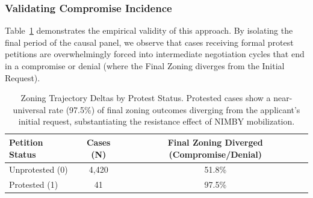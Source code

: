 \subsubsection{Validating Compromise Incidence}
Table~\ref{tbl:zoning_deltas} demonstrates the empirical validity of this approach. By isolating the final period of the causal panel, we observe that cases receiving formal protest petitions are overwhelmingly forced into intermediate negotiation cycles that end in a compromise or denial (where the Final Zoning diverges from the Initial Request).

\begin{table}[h!]
\centering
\begin{tabular}{l c c}
\toprule
\textbf{Petition Status} & \textbf{Cases (N)} & \textbf{Final Zoning Diverged (Compromise/Denial)} \\
\midrule
Unprotested (0) & 4,420 & 51.8\% \\
Protested (1) & 41 & 97.5\% \\
\bottomrule
\end{tabular}
\caption[Zoning Trajectory Deltas by Protest Status]{Zoning Trajectory Deltas by Protest Status. Protested cases show a near-universal rate (97.5\%) of final zoning outcomes diverging from the applicant's initial request, substantiating the resistance effect of NIMBY mobilization.}
\label{tbl:zoning_deltas}
\end{table}
